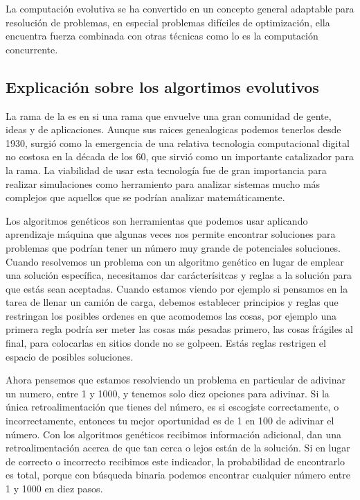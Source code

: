 \documentclass{article}
\begin{document}
La computación evolutiva se ha convertido en un concepto general adaptable para
resolución de problemas, en especial problemas difíciles de optimización, ella encuentra fuerza combinada con otras técnicas como lo es la computación concurrente.\cite{Coley (1999)}

\subsection*{Explicación sobre los algortimos evolutivos}

La rama de la  es en si una rama que envuelve una gran comunidad de gente, ideas y de aplicaciones. Aunque sus raices genealogicas podemos tenerlos desde 1930, surgi\'o como la emergencia de una relativa tecnologia computacional digital no costosa en la d\'ecada de los 60, que sirvi\'o como un importante catalizador para la rama. La viabilidad de usar esta tecnolog\'ia fue de gran importancia para realizar simulaciones como herramiento para analizar sistemas mucho m\'as complejos que aquellos que se podr\'ian analizar matem\'aticamente.\cite{Coley (1999)}

Los algoritmos genéticos son herramientas que podemos usar aplicando aprendizaje máquina que algunas veces nos permite encontrar soluciones para problemas que podrían tener un número muy grande de potenciales soluciones. Cuando resolvemos un problema con un algoritmo genético en lugar de emplear una solución específica, necesitamos dar carácterísitcas y reglas a la solución para que estás sean aceptadas. Cuando estamos viendo por ejemplo si pensamos en la tarea de llenar un camión de carga, debemos establecer principios y reglas que restringan los posibles ordenes en que acomodemos las cosas, por ejemplo una primera regla podría ser meter las cosas más pesadas primero, las cosas frágiles al final, para colocarlas en sitios donde no se golpeen. Estás reglas restrigen el espacio de posibles soluciones.


Ahora pensemos que estamos resolviendo un problema en particular de adivinar un numero, entre 1 y 1000, y tenemos solo diez opciones para adivinar. Si la única retroalimentación que tienes del número, es si escogiste correctamente, o incorrectamente, entonces tu mejor oportunidad es de 1 en 100 de adivinar el número. Con los algoritmos genéticos recibimos información adicional, dan una retroalimentación acerca de que tan cerca o lejos están de la solución.
Si en lugar de correcto o incorrecto recibimos este indicador, la probabilidad de encontrarlo es total, porque con búsqueda binaria podemos encontrar cualquier número entre 1 y 1000 en diez pasos.
\end{document}
